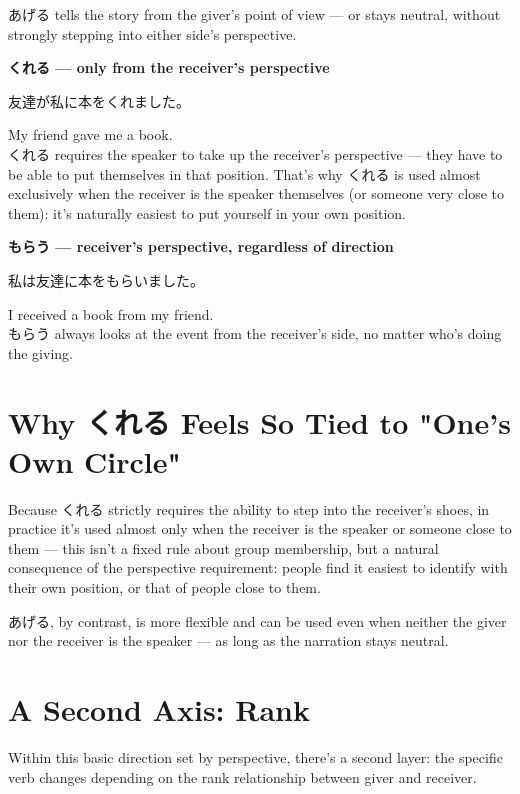 \documentclass[12pt]{book}
\begin{document}
あげる tells the story from the giver's point of view — or stays neutral, without strongly stepping into either side's perspective.

\textbf{くれる — only from the receiver's perspective}
\par\quad 友達が私に本をくれました。\\
\par\quad My friend gave me a book.\\

くれる requires the speaker to take up the receiver's perspective — they have to be able to put themselves in that position. That's why くれる is used almost exclusively when the receiver is the speaker themselves (or someone very close to them): it's naturally easiest to put yourself in your own position.

\textbf{もらう — receiver's perspective, regardless of direction}
\par\quad 私は友達に本をもらいました。\\
\par\quad I received a book from my friend.\\

もらう always looks at the event from the receiver's side, no matter who's doing the giving.

\section*{Why くれる Feels So Tied to "One's Own Circle"}

Because くれる strictly requires the ability to step into the receiver's shoes, in practice it's used almost only when the receiver is the speaker or someone close to them — this isn't a fixed rule about group membership, but a natural consequence of the perspective requirement: people find it easiest to identify with their own position, or that of people close to them.

あげる, by contrast, is more flexible and can be used even when neither the giver nor the receiver is the speaker — as long as the narration stays neutral.

\section*{A Second Axis: Rank}

Within this basic direction set by perspective, there's a second layer: the specific verb changes depending on the rank relationship between giver and receiver.
\end{document}
